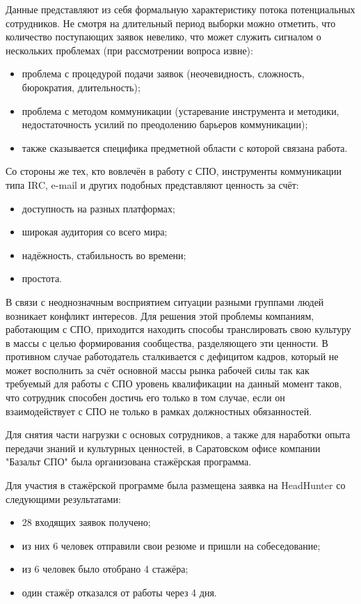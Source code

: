 Данные представляют из себя формальную характеристику потока
потенциальных сотрудников. Не смотря на длительный период выборки можно
отметить, что количество поступающих заявок невелико, что может служить
сигналом о нескольких проблемах (при рассмотрении вопроса извне):

\begin{itemize}
\item проблема с процедурой подачи заявок (неочевидность, сложность,
бюрократия, длительность);
\item проблема с методом коммуникации (устаревание инструмента и
методики, недостаточность усилий по преодолению барьеров коммуникации);
\item также сказывается специфика предметной области с которой связана
работа.
\end{itemize}

Со стороны же тех, кто вовлечён в работу с СПО, инструменты коммуникации
типа IRC, e-mail и других подобных представляют ценность за счёт:

\begin{itemize}
\item доступность на разных платформах;
\item широкая аудитория со всего мира;
\item надёжность, стабильность во времени;
\item простота.
\end{itemize}

В связи с неоднозначным восприятием ситуации разными группами людей
возникает конфликт интересов. Для решения этой проблемы компаниям,
работающим с СПО, приходится находить способы транслировать свою
культуру в массы с целью формирования сообщества, разделяющего эти
ценности. В противном случае работодатель сталкивается с дефицитом
кадров, который не может восполнить за счёт основной массы рынка
рабочей силы так как требуемый для работы с СПО уровень квалификации на
данный момент таков, что сотрудник способен достичь его только в том
случае, если он взаимодействует с СПО не только в рамках должностных
обязанностей.

Для снятия части нагрузки с основых сотрудников, а также для
наработки опыта передачи знаний и культурных ценностей, в Саратовском
офисе компании "Базальт СПО" была организована стажёрская программа.

Для участия в стажёрской программе была размещена заявка на HeadHunter
со следующими результатами:

\begin{itemize}
\item 28 входящих заявок получено;
\item из них 6 человек отправили свои резюме и пришли на собеседование;
\item из 6 человек было отобрано 4 стажёра;
\item один стажёр отказался от работы через 4 дня.
\end{itemize}

